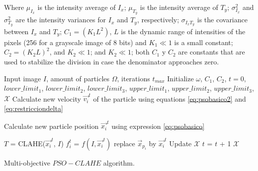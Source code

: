 \documentclass[spanish,twocolumn]{article}
\begin{document}
Where $\mu_{I_x}$ is the intensity average of $I_x$; $\mu_{T_y}$ is the intensity average of $T_y$; $\sigma_{I_x}^2$ and $\sigma_{T_y}^2$ are the intensity variances for $I_x$ and $T_y$, respectively; $\sigma_{I_x T_y}$ is the covariance between $I_x$ and $T_y$; $C_1=(K_1L^2)$, $L$ is the dynamic range of intensities of the pixels (256 for a grayscale image of 8 bits) and $K_1 \ll 1$ is a small constant; $C_2=(K_2 L)^2$, and $K_2 \ll 1$; and $K_2 \ll 1$; both $C_1$ y $C_2$ are constants that are used to stabilize the division in case the denominator approaches zero.

\begin{algorithm}[H]
    \scriptsize
    \begin{algorithmic}[1]
        \Require Input image $I$, amount of particles $\Omega$, iterations $t_{max}$
        \State Initialize $\omega$, $C_1$, $C_2$, $t=0$, $lower\_limit_1$, $lower\_limit_2$, $lower\_limit_3$, $upper\_limit_1$, $upper\_limit_2$, $upper\_limit_3$, $\mathscr{X}$
                \State Calculate new velocity $\overrightarrow{v_i}^t$ of the particle  using equations \eqref{eq:psobasico2} and \eqref{eq:restricciondelta}


                \State Calculate new particle position $\overrightarrow{x_i}^t$ using expression \eqref{eq:psobasico}

                \State ${T}$ = CLAHE(${\overrightarrow{x_i}^t}$, ${I}$)
                \State ${f^t_i}$ = $f(I, \overrightarrow{x_i}^t)$%
                    \State replace $\overrightarrow{x}_{p_i}$ by $\overrightarrow{x_i}^t$
                \EndIf
                    \State Update $\mathscr{X}$
                \EndIf
                \State $t$ = $t$ + 1
            \EndFor
        \EndWhile
    \Ensure $\mathscr{X}$
    \end{algorithmic}
    \caption{Multi-objective $PSO-CLAHE$ algorithm.}
    \label{alg:pso_clahe}
\end{algorithm}
\end{document}
